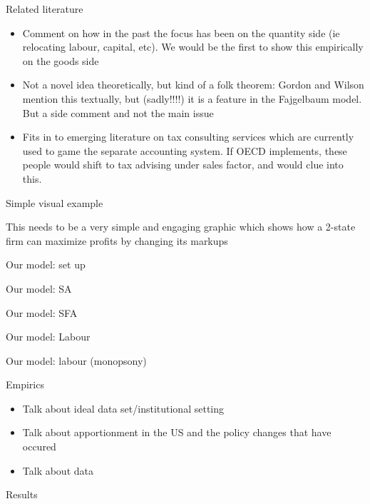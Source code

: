 \documentclass[aspectratio=43]{beamer}
\begin{document}
\begin{frame}{Related literature}
\begin{itemize}


\item Comment on how in the past the focus has been on the quantity side (ie relocating labour, capital, etc). We would be the first to show this empirically on the goods side

\item Not a novel idea theoretically, but kind of a folk theorem: Gordon and Wilson mention this textually, but (sadly!!!!) it is a feature in the Fajgelbaum model. But a side comment and not the main issue

\item Fits in to emerging literature on tax consulting services which are currently used to game the separate accounting system. If OECD implements, these people would shift to tax advising under sales factor, and would clue into this. 


\end{itemize}

\end{frame}

\begin{frame}{Simple visual example}

This needs to be a very simple and engaging graphic which shows how a 2-state firm can maximize profits by changing its markups
\end{frame}

\begin{frame}{Our model: set up}


\end{frame}

\begin{frame}{Our model: SA}


\end{frame}

\begin{frame}{Our model: SFA}


\end{frame}

\begin{frame}{Our model: Labour}


\end{frame}

\begin{frame}{Our model: labour (monopsony)}



\end{frame}

\begin{frame}{Empirics}
\begin{itemize}
\item Talk about ideal data set/institutional setting

\item Talk about apportionment in the US and the policy changes that have occured

\item Talk about data
\end{itemize}

\end{frame}

\begin{frame}{Results}

\end{frame}
\end{document}
